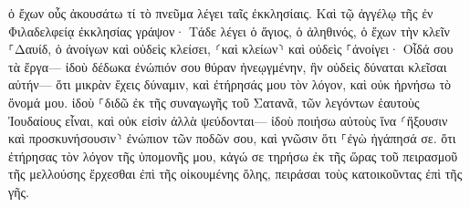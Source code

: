 \documentclass{openreader}
\begin{document}
ὁ ἔχων οὖς ἀκουσάτω τί τὸ πνεῦμα λέγει ταῖς ἐκκλησίαις. 
Καὶ τῷ ἀγγέλῳ τῆς ἐν Φιλαδελφείᾳ ἐκκλησίας γράψον· Τάδε λέγει ὁ ἅγιος, ὁ ἀληθινός, ὁ ἔχων τὴν κλεῖν ⸀Δαυίδ, ὁ ἀνοίγων καὶ οὐδεὶς κλείσει, ⸂καὶ κλείων⸃ καὶ οὐδεὶς ⸀ἀνοίγει· 
Οἶδά σου τὰ ἔργα— ἰδοὺ δέδωκα ἐνώπιόν σου θύραν ἠνεῳγμένην, ἣν οὐδεὶς δύναται κλεῖσαι αὐτήν— ὅτι μικρὰν ἔχεις δύναμιν, καὶ ἐτήρησάς μου τὸν λόγον, καὶ οὐκ ἠρνήσω τὸ ὄνομά μου. 
ἰδοὺ ⸀διδῶ ἐκ τῆς συναγωγῆς τοῦ Σατανᾶ, τῶν λεγόντων ἑαυτοὺς Ἰουδαίους εἶναι, καὶ οὐκ εἰσὶν ἀλλὰ ψεύδονται— ἰδοὺ ποιήσω αὐτοὺς ἵνα ⸂ἥξουσιν καὶ προσκυνήσουσιν⸃ ἐνώπιον τῶν ποδῶν σου, καὶ γνῶσιν ὅτι ⸀ἐγὼ ἠγάπησά σε. 
ὅτι ἐτήρησας τὸν λόγον τῆς ὑπομονῆς μου, κἀγώ σε τηρήσω ἐκ τῆς ὥρας τοῦ πειρασμοῦ τῆς μελλούσης ἔρχεσθαι ἐπὶ τῆς οἰκουμένης ὅλης, πειράσαι τοὺς κατοικοῦντας ἐπὶ τῆς γῆς. 
\end{document}
